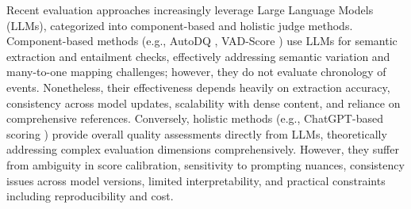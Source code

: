Recent evaluation approaches increasingly leverage Large Language Models (LLMs), categorized into component-based and holistic judge methods. Component-based methods (e.g., AutoDQ \cite{wang2024tarsier}, VAD-Score \cite{dubey2025leveraging}) use LLMs for semantic extraction and entailment checks, effectively addressing semantic variation and many-to-one mapping challenges; however, they do not evaluate chronology of events. Nonetheless, their effectiveness depends heavily on extraction accuracy, consistency across model updates, scalability with dense content, and reliance on comprehensive references. Conversely, holistic methods (e.g., ChatGPT-based scoring \cite{achiam2023gpt}) provide overall quality assessments directly from LLMs, theoretically addressing complex evaluation dimensions comprehensively. However, they suffer from ambiguity in score calibration, sensitivity to prompting nuances, consistency issues across model versions, limited interpretability, and practical constraints including reproducibility and cost.

